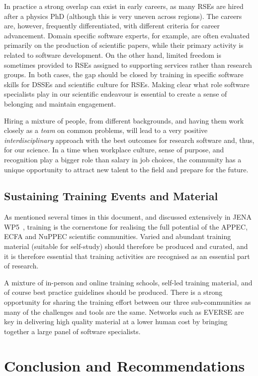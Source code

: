 In practice a strong overlap can exist in early careers, as many RSEs are hired after a physics PhD (although this is very uneven across regions). The careers are, however, frequently differentiated, with different criteria for career advancement. Domain specific software experts, for example, are often evaluated primarily on the production of scientific papers, while their primary activity is related to software development. On the other hand, limited freedom is sometimes provided to RSEs assigned to supporting services rather than research groups. In both cases, the gap should be closed by training in specific software skills for DSSEs and scientific culture for RSEs. Making clear what role software specialists play in our scientific endeavour is essential to create a sense of belonging and maintain engagement.

Hiring a mixture of people, from different backgrounds, and having them work closely as a \emph{team} on common problems, will lead to a very positive \emph{interdisciplinary} approach with the best outcomes for research software and, thus, for our science. In a time when workplace culture, sense of purpose, and recognition play a bigger role than salary in job choices, the community has a unique opportunity to attract new talent to the field and prepare for the future.

\subsection{Sustaining Training Events and Material}

As mentioned several times in this document, and discussed extensively in JENA WP5~\cite{JENA_WG_Reports}, training is the cornerstone for realising the full potential of the APPEC, ECFA and NuPPEC scientific communities. Varied and abundant training material (suitable for self-study) should therefore be produced and curated, and it is therefore essential that training activities are recognised as an essential part of research.

A mixture of in-person and online training schools, self-led training material, and of course best practice guidelines should be produced. There is a strong opportunity for sharing the training effort between our three sub-communities as many of the challenges and tools are the same. Networks such as EVERSE are key in delivering high quality material at a lower human cost by bringing together a large panel of software specialists.


\section{Conclusion and Recommendations}

